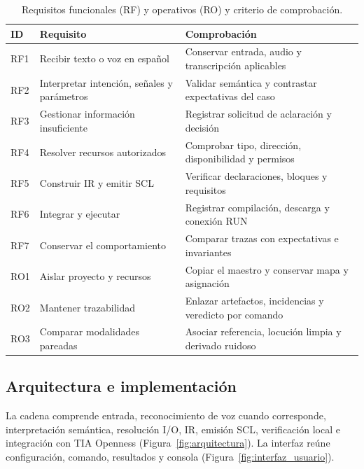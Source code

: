 \documentclass[a4paper,fleqn]{cas-dc}
\begin{document}
\begin{table}[!tp]
\caption{Requisitos funcionales (RF) y operativos (RO) y criterio de comprobación.}
\label{tab:requisitos_arquitectura}
\small
\begin{tabularx}{\textwidth}{@{}l >{\raggedright\arraybackslash}X >{\raggedright\arraybackslash}X@{}}
\toprule ID & Requisito & Comprobación\\ \midrule
RF1 & Recibir texto o voz en español & Conservar entrada, audio y transcripción aplicables\\
RF2 & Interpretar intención, señales y parámetros & Validar semántica y contrastar expectativas del caso\\
RF3 & Gestionar información insuficiente & Registrar solicitud de aclaración y decisión\\
RF4 & Resolver recursos autorizados & Comprobar tipo, dirección, disponibilidad y permisos\\
RF5 & Construir IR y emitir SCL & Verificar declaraciones, bloques y requisitos\\
RF6 & Integrar y ejecutar & Registrar compilación, descarga y conexión RUN\\
RF7 & Conservar el comportamiento & Comparar trazas con expectativas e invariantes\\
RO1 & Aislar proyecto y recursos & Copiar el maestro y conservar mapa y asignación\\
RO2 & Mantener trazabilidad & Enlazar artefactos, incidencias y veredicto por comando\\
RO3 & Comparar modalidades pareadas & Asociar referencia, locución limpia y derivado ruidoso\\
\bottomrule
\end{tabularx}
\end{table}

\subsection{Arquitectura e implementación}
\label{sec:arquitectura}
La cadena comprende entrada, reconocimiento de voz cuando corresponde, interpretación semántica, resolución I/O, IR, emisión SCL, verificación local e integración con TIA Openness (Figura~\ref{fig:arquitectura}). La interfaz reúne configuración, comando, resultados y consola (Figura~\ref{fig:interfaz_usuario}).
\end{document}
